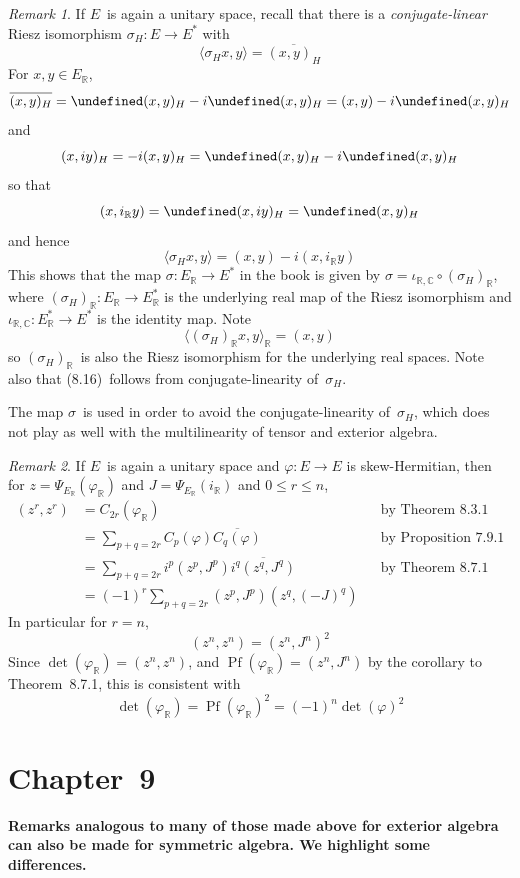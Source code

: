 \documentclass[letterpaper,12pt]{article}
\newcommand{\R}{\mathbb{R}}
\newcommand{\C}{\mathbb{C}}
\DeclareMathOperator{\Pf}{Pf}
\let\Re\undefined
\DeclareMathOperator{\Re}{Re}
\let\Im\undefined
\DeclareMathOperator{\Im}{Im}
\newcommand{\after}{\circ}
\newcommand{\sprod}[2]{\langle#1,#2\rangle}
\newcommand{\iprod}[2]{(#1,#2)}
\newcommand{\conj}[1]{\overline{#1}}
\newcommand{\ur}[1]{#1_{\R}}
\newcommand{\ir}{\ur{i}}
\theoremstyle{definition}
\theoremstyle{remark}
\newtheorem*{rmk}{Remark}
\begin{document}
\begin{rmk}
If \(E\)~is again a unitary space, recall that there is a \emph{conjugate-linear} Riesz isomorphism \(\sigma_H:E\to E^*\) with
\[\sprod{\sigma_H x}{y}=\conj{\iprod{x}{y}_H}\]
For \(x,y\in\ur{E}\),
\[\conj{\iprod{x}{y}_H}=\Re\iprod{x}{y}_H-i\Im\iprod{x}{y}_H=\iprod{x}{y}-i\Im\iprod{x}{y}_H\]
and
\[\iprod{x}{iy}_H=-i\iprod{x}{y}_H=\Im\iprod{x}{y}_H-i\Re\iprod{x}{y}_H\]
so that
\[\iprod{x}{\ir y}=\Re\iprod{x}{iy}_H=\Im\iprod{x}{y}_H\]
and hence
\[\sprod{\sigma_H x}{y}=\iprod{x}{y}-i\iprod{x}{\ir y}\]
This shows that the map \(\sigma:\ur{E}\to E^*\) in the book is given by \(\sigma=\iota_{\R,\C}\after\ur{(\sigma_H)}\), where \(\ur{(\sigma_H)}:\ur{E}\to\ur{E^*}\) is the underlying real map of the Riesz isomorphism and \(\iota_{\R,\C}:\ur{E^*}\to E^*\) is the identity map. Note
\[\sprod{\ur{(\sigma_H)}x}{y}_{\R}=\iprod{x}{y}\]
so \(\ur{(\sigma_H)}\)~is also the Riesz isomorphism for the underlying real spaces. Note also that (8.16)~follows from conjugate-linearity of~\(\sigma_H\).

The map \(\sigma\)~is used in order to avoid the conjugate-linearity of~\(\sigma_H\), which does not play as well with the multilinearity of tensor and exterior algebra.
\end{rmk}

\begin{rmk}
If \(E\)~is again a unitary space and \(\varphi:E\to E\) is skew-Hermitian, then for \(z=\Psi_{\ur{E}}(\ur{\varphi})\) and \(J=\Psi_{\ur{E}}(\ir)\) and \(0\le r\le n\),
\begin{align*}
\iprod{z^r}{z^r}&=C_{2r}(\ur{\varphi})&&\text{by Theorem 8.3.1}\\
	&=\sum_{p+q=2r}C_p(\varphi)\conj{C_q(\varphi)}&&\text{by Proposition 7.9.1}\\
	&=\sum_{p+q=2r}i^p\iprod{z^p}{J^p}\conj{i^q\iprod{z^q}{J^q}}&&\text{by Theorem 8.7.1}\\
	&=(-1)^r\sum_{p+q=2r}\iprod{z^p}{J^p}\iprod{z^q}{(-J)^q}&&
\end{align*}
In particular for \(r=n\),
\[\iprod{z^n}{z^n}=\iprod{z^n}{J^n}^2\]
Since \(\det(\ur{\varphi})=\iprod{z^n}{z^n}\), and \(\Pf(\ur{\varphi})=\iprod{z^n}{J^n}\) by the corollary to Theorem~8.7.1, this is consistent with
\[\det(\ur{\varphi})=\Pf(\ur{\varphi})^2=(-1)^n\det(\varphi)^2\]
\end{rmk}

\newpage
\section*{Chapter~9}
\textbf{Remarks analogous to many of those made above for exterior algebra can also be made for symmetric algebra. We highlight some differences.}
\end{document}
